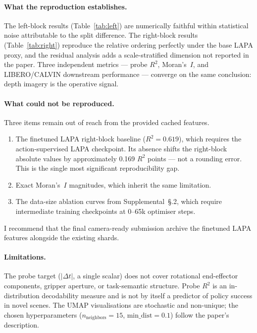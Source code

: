 \documentclass[11pt]{article}
\begin{document}
\paragraph{What the reproduction establishes.}
The left-block results (Table~\ref{tab:left}) are numerically faithful within
statistical noise attributable to the split difference.
The right-block results (Table~\ref{tab:right}) reproduce the relative ordering
perfectly under the base LAPA proxy, and the residual analysis adds a
scale-stratified dimension not reported in the paper.
Three independent metrics --- probe $R^2$, Moran's~$I$, and LIBERO/CALVIN
downstream performance --- converge on the same conclusion: depth imagery is
the operative signal.

\paragraph{What could not be reproduced.}
Three items remain out of reach from the provided cached features.
\begin{enumerate}[noitemsep]
  \item The finetuned LAPA right-block baseline ($R^2{=}0.619$), which requires
        the action-supervised LAPA checkpoint. Its absence shifts the right-block
        absolute values by approximately 0.169 $R^2$ points --- not a rounding
        error. This is the single most significant reproducibility gap.
  \item Exact Moran's~$I$ magnitudes, which inherit the same limitation.
  \item The data-size ablation curves from Supplemental~\S.2, which require
        intermediate training checkpoints at 0--65k optimiser steps.
\end{enumerate}

I recommend that the final camera-ready submission archive the finetuned LAPA
features alongside the existing shards.

\paragraph{Limitations.}
The probe target ($|\Delta t|$, a single scalar) does not cover rotational
end-effector components, gripper aperture, or task-semantic structure.
Probe $R^2$ is an in-distribution decodability measure and is not by itself a
predictor of policy success in novel scenes.
The UMAP visualisations are stochastic and non-unique; the chosen
hyperparameters ($n_\text{neighbors}{=}15$, $\text{min\_dist}{=}0.1$) follow
the paper's description.
\end{document}

